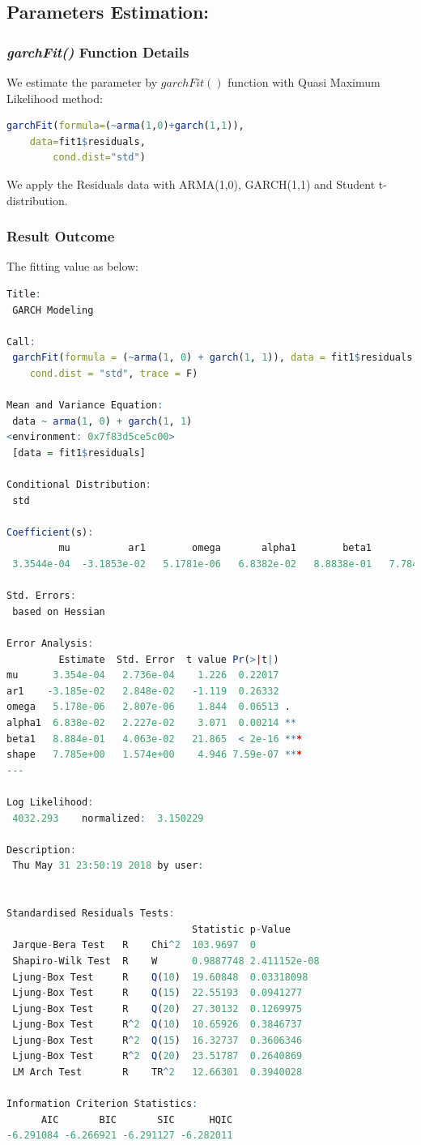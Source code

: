 \subsection{Parameters Estimation:}
\subsubsection{\textit{garchFit()} Function Details}
We estimate the parameter by $garchFit()$ function with Quasi Maximum Likelihood method:
\begin{lstlisting}[language=R]
garchFit(formula=(~arma(1,0)+garch(1,1)), 
	data=fit1$residuals,
        cond.dist="std")
\end{lstlisting}
We apply the Residuals data with ARMA(1,0), GARCH(1,1) and Student t-distribution.\\
\subsubsection{Result Outcome}
The fitting value as below:
\begin{lstlisting}[language=R]
Title:
 GARCH Modeling 

Call:
 garchFit(formula = (~arma(1, 0) + garch(1, 1)), data = fit1$residuals, 
    cond.dist = "std", trace = F) 

Mean and Variance Equation:
 data ~ arma(1, 0) + garch(1, 1)
<environment: 0x7f83d5ce5c00>
 [data = fit1$residuals]

Conditional Distribution:
 std 

Coefficient(s):
         mu          ar1        omega       alpha1        beta1        shape  
 3.3544e-04  -3.1853e-02   5.1781e-06   6.8382e-02   8.8838e-01   7.7848e+00  

Std. Errors:
 based on Hessian 

Error Analysis:
         Estimate  Std. Error  t value Pr(>|t|)    
mu      3.354e-04   2.736e-04    1.226  0.22017    
ar1    -3.185e-02   2.848e-02   -1.119  0.26332    
omega   5.178e-06   2.807e-06    1.844  0.06513 .  
alpha1  6.838e-02   2.227e-02    3.071  0.00214 ** 
beta1   8.884e-01   4.063e-02   21.865  < 2e-16 ***
shape   7.785e+00   1.574e+00    4.946 7.59e-07 ***
---

Log Likelihood:
 4032.293    normalized:  3.150229 

Description:
 Thu May 31 23:50:19 2018 by user:  


Standardised Residuals Tests:
                                Statistic p-Value     
 Jarque-Bera Test   R    Chi^2  103.9697  0           
 Shapiro-Wilk Test  R    W      0.9887748 2.411152e-08
 Ljung-Box Test     R    Q(10)  19.60848  0.03318098  
 Ljung-Box Test     R    Q(15)  22.55193  0.0941277   
 Ljung-Box Test     R    Q(20)  27.30132  0.1269975   
 Ljung-Box Test     R^2  Q(10)  10.65926  0.3846737   
 Ljung-Box Test     R^2  Q(15)  16.32737  0.3606346   
 Ljung-Box Test     R^2  Q(20)  23.51787  0.2640869   
 LM Arch Test       R    TR^2   12.66301  0.3940028   

Information Criterion Statistics:
      AIC       BIC       SIC      HQIC 
-6.291084 -6.266921 -6.291127 -6.282011 
\end{lstlisting}
